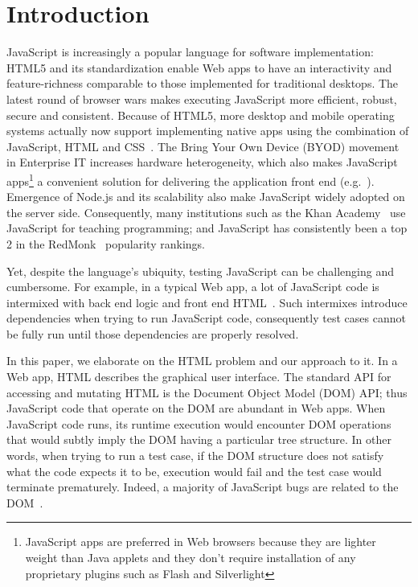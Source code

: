 \section{Introduction}
JavaScript is increasingly a popular language for software implementation: %
HTML5 and its standardization enable Web apps to have an interactivity and feature-richness comparable to those implemented for traditional desktops.  
The latest round of browser wars makes executing JavaScript more efficient, robust, secure and consistent.  
Because of HTML5, more desktop and mobile operating systems actually now support implementing native apps using the combination of JavaScript, HTML and CSS~\cite{jalangi}.
The Bring Your Own Device (BYOD) movement in Enterprise IT increases hardware heterogeneity, which also makes JavaScript apps\footnote{JavaScript apps are preferred in Web browsers because they are lighter weight than Java applets and they don't require installation of any proprietary plugins such as Flash and Silverlight} a convenient solution for delivering the application front end (e.g.~\cite{BNSFoffice365}).
Emergence of Node.js and its scalability also make JavaScript widely adopted on the server side.
Consequently, many institutions such as the Khan Academy~\cite{khanAcademy} use JavaScript for teaching programming; and JavaScript has consistently been a top 2 in the RedMonk~\cite{redmonk} popularity rankings.%

Yet, despite the language's ubiquity, testing JavaScript can be challenging and cumbersome.
For example, in a typical Web app, a lot of JavaScript code is intermixed with back end logic and front end HTML~\cite{QUnitIntro}.
Such intermixes introduce dependencies when trying to run JavaScript code, consequently test cases cannot be fully run until those dependencies are properly resolved.

In this paper, we elaborate on the HTML problem and our approach to it.
In a Web app, HTML describes the graphical user interface.  The standard API for accessing and mutating HTML is the Document Object Model (DOM) API; thus JavaScript code that operate on the DOM are abundant in Web apps.
When JavaScript code runs, its runtime execution would encounter DOM operations that would subtly imply the DOM having a particular tree structure. 
In other words, when trying to run a test case, if the DOM structure does not satisfy what the code expects it to be, execution would fail and the test case would terminate prematurely.
Indeed, a majority of JavaScript bugs are related to the DOM~\cite{frolin2013}.

